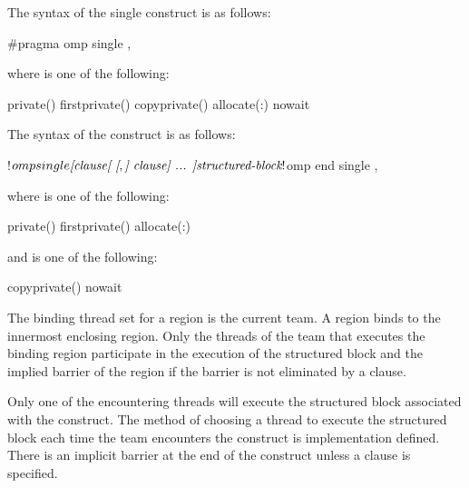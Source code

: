 \syntax
\begin{ccppspecific}
The syntax of the single construct is as follows:

\begin{ompcPragma}
#pragma omp single \plc{[clause[ [},\plc{] clause] ... ] new-line}
\end{ompcPragma}

\begin{samepage}
where  is one of the following:

\begin{indentedcodelist}
private()
firstprivate()
copyprivate()
allocate(\plc{[allocator }:\plc{] list})
nowait
\end{indentedcodelist}
\end{samepage}
\end{ccppspecific}

\begin{fortranspecific}
The syntax of the  construct is as follows:

\begin{ompfPragma}
!$omp single \plc{[clause[ [},\plc{] clause] ... ]}
   \plc{structured-block}
!$omp end single \plc{[end_clause[ [},\plc{] end_clause] ... ]}
\end{ompfPragma}

where  is one of the following:

\begin{indentedcodelist}
private()
firstprivate()
allocate(\plc{[allocator }:\plc{] list})
\end{indentedcodelist}

and  is one of the following:

\begin{indentedcodelist}
copyprivate()
nowait
\end{indentedcodelist}
\end{fortranspecific}

\binding
The binding thread set for a  region is the current team. 
A  region binds to the innermost enclosing  
region. Only the threads of the team that executes the binding  
region participate in the execution of the structured block and the implied 
barrier of the  region if the barrier is not eliminated by a
 clause.

\descr
Only one of the encountering threads will execute the structured block 
associated with the  construct. The method of choosing a thread 
to execute the structured block each time the team encounters the construct
is implementation defined. There is an implicit barrier at the end of the 
 construct unless a  clause is specified.

